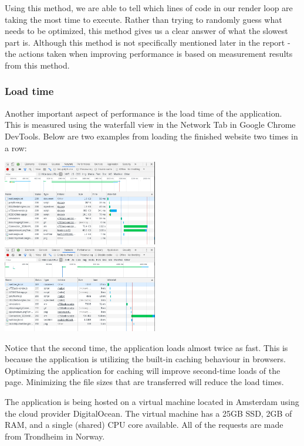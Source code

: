 Using this method, we are able to tell which lines of code in our render
loop are taking the most time to execute. Rather than trying to randomly
guess what needs to be optimized, this method gives us a clear answer of
what the slowest part is. Although this method is not specifically
mentioned later in the report - the actions taken when improving
performance is based on measurement results from this method.

\hypertarget{load-time}{%
\subsubsection{Load time}\label{load-time}}

Another important aspect of performance is the load time of the
application. This is measured using the waterfall view in the Network
Tab in Google Chrome DevTools. Below are two examples from loading the
finished website two times in a row:

\includegraphics[width=2.66667in,height=\textheight]{waterfall.png}
\includegraphics[width=2.66667in,height=\textheight]{waterfall-cached.png}

Notice that the second time, the application loads almost twice as fast.
This is because the application is utilizing the built-in caching
behaviour in browsers. Optimizing the application for caching will
improve second-time loads of the page. Minimizing the file sizes that
are transferred will reduce the load times.

The application is being hosted on a virtual machine located in
Amsterdam using the cloud provider DigitalOcean. The virtual machine has
a 25GB SSD, 2GB of RAM, and a single (shared) CPU core available. All of
the requests are made from Trondheim in Norway.

